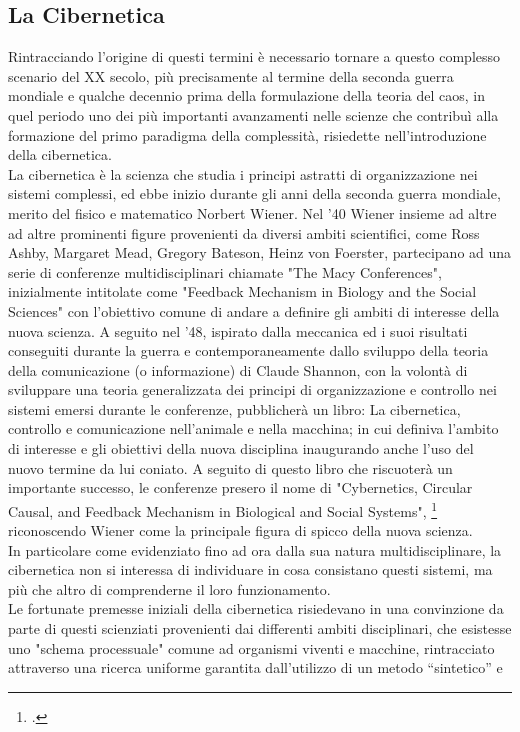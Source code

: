 \subsection{La Cibernetica}
\label{sec:La Cibernetica}
Rintracciando l'origine di questi termini è necessario tornare 
a questo complesso scenario del XX secolo,
più precisamente al termine della seconda guerra mondiale e
qualche decennio prima della formulazione della teoria del caos,
in quel periodo uno dei più importanti avanzamenti nelle scienze che contribuì alla
formazione del primo paradigma della complessità,
risiedette nell'introduzione della cibernetica. \\
La cibernetica è la scienza che studia i principi astratti di organizzazione
nei sistemi complessi, ed ebbe inizio durante gli anni della seconda guerra
mondiale, merito del fisico e matematico Norbert Wiener.
Nel '40 Wiener insieme ad altre ad altre prominenti figure provenienti
da diversi ambiti scientifici,
come Ross Ashby, Margaret Mead, Gregory Bateson, Heinz von Foerster,
partecipano ad una serie di conferenze
multidisciplinari chiamate "The Macy Conferences", inizialmente intitolate come
"Feedback Mechanism in Biology and the Social Sciences"
con l'obiettivo comune di andare a definire
gli ambiti di interesse della nuova scienza.
A seguito nel '48,
ispirato dalla meccanica ed i suoi risultati conseguiti durante la guerra
e contemporaneamente dallo sviluppo della teoria della comunicazione
(o informazione) di Claude Shannon,
con la volontà di sviluppare una teoria generalizzata dei principi di
organizzazione e controllo nei sistemi emersi durante le conferenze,
pubblicherà un libro:
La cibernetica, controllo e comunicazione nell'animale e nella macchina;
in cui definiva l'ambito di interesse e gli obiettivi della nuova disciplina
inaugurando anche l'uso del nuovo termine da lui coniato.
A seguito di questo libro che riscuoterà
un importante successo, le conferenze presero il nome di
"Cybernetics, Circular Causal, and Feedback Mechanism
in Biological and Social Systems", \footcite{fabbrisgiustinianocyb}
riconoscendo Wiener come la principale figura di spicco della nuova scienza. \\
In particolare come evidenziato fino ad ora dalla sua natura multidisciplinare,
la cibernetica non si interessa di individuare in
cosa consistano questi sistemi,
ma più che altro di comprenderne il loro funzionamento. \\
Le fortunate premesse iniziali della cibernetica risiedevano in una convinzione
da parte di questi scienziati provenienti dai differenti ambiti disciplinari,
che esistesse uno "schema processuale" comune ad organismi viventi e macchine,
rintracciato attraverso una ricerca uniforme
garantita dall'utilizzo di un metodo
“sintetico” e

